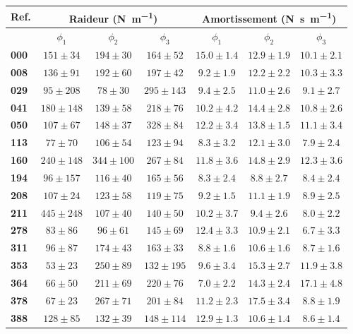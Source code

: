 \begin{appendices}
	\begin{tabular}{|l|c|c|c|c|c|c|}
		\hline
		\multicolumn{1}{|c|}{Ref.}&\multicolumn{3}{c|}{Raideur (\si{\newton\per\meter})} & \multicolumn{3}{c|}{Amortissement (\si{\newton\second\per\meter})} \\[2mm]
		\hline
		&$\phi_1$&$\phi_2$&$\phi_3$&$\phi_1$&$\phi_2$&$\phi_3$\\\hline
		\textbf{000}&$151 \pm 34$&$194 \pm 30$&$164 \pm 52$&$15.0 \pm 1.4$&$12.9 \pm 1.9$&$10.1 \pm 2.1$\\\hline
		\textbf{008}&$136 \pm 91$&$192 \pm 60$&$197 \pm 42$&$9.2 \pm 1.9$&$12.2 \pm 2.2$&$10.3 \pm 3.3$\\\hline
		\textbf{029}&$95 \pm 208$&$78 \pm 30$&$295 \pm 143$&$9.4 \pm 2.5$&$11.0 \pm 2.6$&$9.1 \pm 2.7$\\\hline
		\textbf{041}&$180 \pm 148$&$139 \pm 58$&$218 \pm 76$&$10.2 \pm 4.2$&$14.4 \pm 2.8$&$10.8 \pm 2.6$\\\hline
		\textbf{050}&$107 \pm 67$&$148 \pm 37$&$328 \pm 84$&$12.2 \pm 3.4$&$13.8 \pm 1.5$&$11.1 \pm 3.4$\\\hline
		\textbf{113}&$77 \pm 70$&$106 \pm 54$&$123 \pm 94$&$8.3 \pm 3.2$&$12.1 \pm 3.0$&$7.9 \pm 2.4$\\\hline
		\textbf{160}&$240 \pm 148$&$344 \pm 100$&$267 \pm 84$&$11.8 \pm 3.6$&$14.8 \pm 2.9$&$12.3 \pm 3.6$\\\hline
		\textbf{194}&$96 \pm 157$&$116 \pm 40$&$165 \pm 56$&$8.3 \pm 2.4$&$8.8 \pm 2.7$&$8.4 \pm 2.4$\\\hline
		\textbf{208}&$107 \pm 24$&$123 \pm 58$&$119 \pm 75$&$9.2 \pm 1.5$&$11.1 \pm 1.9$&$8.9 \pm 2.5$\\\hline
		\textbf{211}&$445 \pm 248$&$107 \pm 40$&$140 \pm 50$&$10.2 \pm 3.7$&$9.4 \pm 2.6$&$8.0 \pm 2.2$\\\hline
		\textbf{278}&$83 \pm 86$&$96 \pm 61$&$145 \pm 69$&$12.4 \pm 3.3$&$10.9 \pm 2.1$&$6.7 \pm 3.3$\\\hline
		\textbf{311}&$96 \pm 87$&$174 \pm 43$&$163 \pm 33$&$8.8 \pm 1.6$&$10.6 \pm 1.6$&$8.7 \pm 1.6$\\\hline
		\textbf{353}&$53 \pm 23$&$250 \pm 89$&$132 \pm 195$&$9.6 \pm 3.4$&$15.3 \pm 2.7$&$11.9 \pm 3.8$\\\hline
		\textbf{364}&$66 \pm 50$&$211 \pm 69$&$220 \pm 76$&$7.0 \pm 2.2$&$14.3 \pm 2.4$&$17.1 \pm 4.8$\\\hline
		\textbf{378}&$67 \pm 23$&$267 \pm 71$&$201 \pm 84$&$11.2 \pm 2.3$&$17.5 \pm 3.4$&$8.8 \pm 1.9$\\\hline
		\textbf{388}&$128 \pm 85$&$132 \pm 39$&$148 \pm 114$&$12.9 \pm 1.3$&$10.6 \pm 1.4$&$8.6 \pm 1.4$\\\hline

\end{tabular}
\end{appendices}
